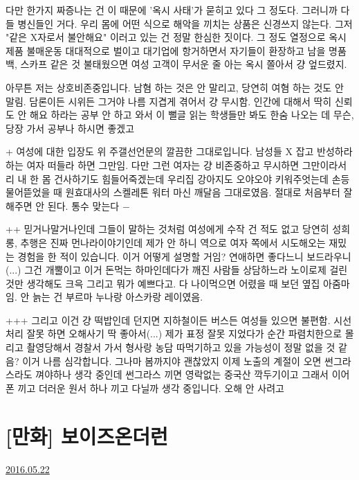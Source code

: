 다만 한가지 짜증나는 건 이 때문에 '옥시 사태'가 묻히고 있다 그 정도다. 그러니까 다들 병신들인 거다.
우리 몸에 어떤 식으로 해악을 끼치는 상품은 신경쓰지 않는다. 그저 "같은 X자로서 불안해요" 이러고 있는 건 정말 한심한 짓이다.
그 정도 열정으로 옥시제품 불매운동 대대적으로 벌이고 대기업에 항거하면서
자기들이 환장하고 남을 명품 백, 스카프 같은 것 불태웠으면 여성 고객이 무서운 줄 아는 옥시 쫄아서 걍 엎드렸지.
\vspace{5mm}

아무튼 저는 상호비존중입니다. 남혐 하는 것은 안 말리고, 당연히 여혐 하는 것도 안 말림.
담론이든 시위든 그거야 나름 지겹게 겪어서 걍 무시함. 인간에 대해서 딱히 신뢰도 안 해요
하라는 공부 안 하고 와서 이 뻘글 읽는 학생들만 봐도 한숨 나오는 데 무슨, 당장 가서 공부나 하시면 좋겠고
\vspace{5mm}

+
여성에 대한  입장도 위 주갤선언문의 깔끔한 그대로입니다.
남성들 X 잡고 반성하라하는 여자 떠들라 하면 그만임. 다만 그런 여자는 걍 비존중하고 무시하면 그만이라서리
내 한 몸 건사하기도 힘들어죽겠는데
우리집 강아지도 오야오야 키워주엇는데 손등 물어뜯었을 때 원효대사의 스켈레톤 워터 마신 깨달음 그대로였음.
절대로 처음부터 잘 해주면 안 된다. 통수 맞는다 $-$
\vspace{5mm}

++
믿거나말거나인데 그들이 말하는 것처럼 여성에게 수작 건 적도 없고 당연히 성희롱, 추행은 진짜 먼나라이야기인데
제가 안 하니 역으로 여자 쪽에서 시도해오는 재밌는 경험을 한 적이 있습니다. 이거 어떻게 설명할 거임?
연애하면 좋다느니 보드라우니(...) 그건 개뿔이고 이거 돈먹는 하마인데다가 깨진 사람들 상담하느라 노이로제 걸린 것만 생각해도 크윽
그리고 뭐가 예쁘다고. 다 나이먹으면 어렸을 때 보던 옆집 아줌마임. 안 늙는 건 부르마 누나랑 아스카랑 레이였음.
\vspace{5mm}

+++
그리고 이건 걍 떡밥인데 던지면 지하철이든 버스든 여성들 있으면 불편함. 시선처리 잘못 하면 오해사기 딱 좋아서(...)
제가 표정 잘못 지었다가 순간 파렴치한으로 몰리고 촬영당해서 경찰서 가서 형사랑 농담 따먹기하고 있을 가능성이 정말 없을 것 같음?
이거 나름 심각합니다. 그나마 봄까지야 괜찮았지 이제 노출의 계절이 오면 썬그라스라도 껴야하나 생각 중인데
썬그라스 끼면 영락없는 중국산 깍두기이고 그래서 이어폰 끼고 더러운 원서 하나 끼고 다닐까 생각 중입니다. 오해 안 사려고
\vspace{5mm}






\section{[만화] 보이즈온더런}
\href{https://www.kockoc.com/Apoc/787126}{2016.05.22}

